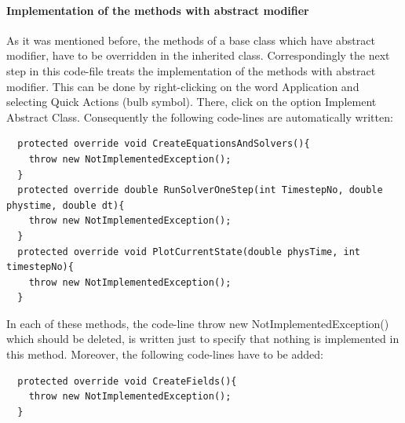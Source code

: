 \documentclass[11pt,twoside,a4paper]{fdyartcl}
\begin{document}
\paragraph{Implementation of the methods with abstract modifier}
As it was mentioned before, the methods of a base class which have abstract modifier, have to be overridden in the inherited class. Correspondingly the next step in this code-file treats the implementation of the methods with abstract modifier. This can be done by right-clicking on the word {\scriptsize Application} and selecting {\scriptsize Quick Actions} (bulb symbol). There, click on the option {\scriptsize Implement Abstract Class}. Consequently the following code-lines are automatically written:
{\scriptsize \begin{verbatim}
  protected override void CreateEquationsAndSolvers(){
    throw new NotImplementedException();
  }
  protected override double RunSolverOneStep(int TimestepNo, double phystime, double dt){
    throw new NotImplementedException();
  }
  protected override void PlotCurrentState(double physTime, int timestepNo){
    throw new NotImplementedException();
  }
\end{verbatim}}
In each of these methods, the code-line {\scriptsize throw new NotImplementedException()} which should be deleted, is written just to specify that nothing is implemented in this method. Moreover, the following code-lines have to be added:
{\scriptsize \begin{verbatim}
  protected override void CreateFields(){
    throw new NotImplementedException();
  }
\end{verbatim}}
\end{document}
